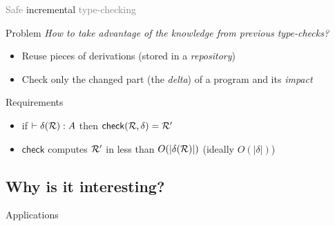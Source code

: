 \documentclass{beamer}
\theoremstyle{example}
\begin{document}
\begin{frame}{\textcolor{gray}{Safe} incremental
    \textcolor{gray}{type-checking}}

    \begin{block}{Problem}
      \emph{How to take advantage of the knowledge from previous type-checks?}
      \begin{itemize}
      \item Reuse pieces of derivations (stored in a \emph{repository})
      \item Check only the changed part (the \emph{delta}) of a
        program and its \emph{impact}
      \end{itemize}

        \centering
    \end{block}
    \pause

    \begin{block}{Requirements}
      \begin{itemize}
      \item if $\vdash \delta(\mathcal{R}) : A$ then ${\rm\mathsf{check}}({\mathcal{R},
          \delta}) = \mathcal{R'}$
      \item $\mathsf{check}$ computes $\mathcal{R'}$ in less than $O(|\delta(\mathcal{R})|)$ \small\qquad (ideally
        $O(|\delta|)$)
      \end{itemize}
    \end{block}

\end{frame}

\subsection{Why is it interesting?}

\begin{frame}{}
  \begin{center}
    {\centering\huge Applications}
  \end{center}
\end{frame}
\end{document}
